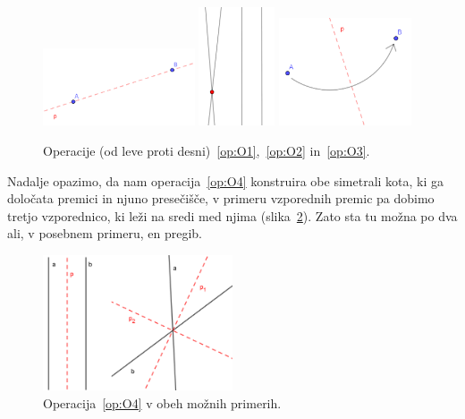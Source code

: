 \begin{figure}[h]
    \centering
    \includegraphics[width=0.4\textwidth]{images/origami_operacije/O1.png}
    \includegraphics[width=0.2\textwidth]{images/origami_operacije/O2.png}
    \includegraphics[width=0.35\textwidth]{images/origami_operacije/O3.png}
    \caption[Operacije~\ref{op:O1},~\ref{op:O2} in~\ref{op:O3}]{Operacije (od leve proti desni)~\ref{op:O1},~\ref{op:O2} in~\ref{op:O3}.}
    \label{fig:O1-O3}
\end{figure}

Nadalje opazimo, da nam operacija~\ref{op:O4} konstruira obe simetrali kota, ki ga določata premici in njuno presečišče, v primeru vzporednih premic pa dobimo tretjo vzporednico, ki leži na sredi med njima (slika~\ref{fig:O4}). Zato sta tu možna po dva ali, v posebnem primeru, en pregib.

\begin{figure}[h]
    \centering
    \includegraphics[width=0.5\textwidth]{images/origami_operacije/O4.png}
    \caption[Operacija~\ref{op:O4}]{Operacija~\ref{op:O4} v obeh možnih primerih.}
    \label{fig:O4}
\end{figure}

